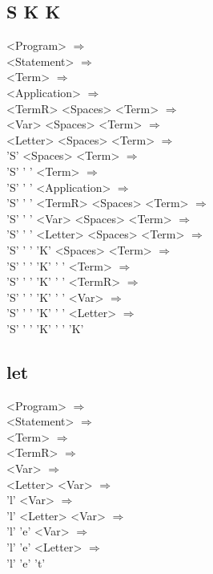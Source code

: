 \documentclass{article}
\begin{document}
\subsection{S K K}
<Program> $\Rightarrow$ \\
<Statement> $\Rightarrow$ \\
<Term> $\Rightarrow$ \\
<Application> $\Rightarrow$ \\
<TermR> <Spaces> <Term> $\Rightarrow$ \\
<Var> <Spaces> <Term> $\Rightarrow$ \\
<Letter> <Spaces> <Term> $\Rightarrow$ \\
'S' <Spaces> <Term> $\Rightarrow$ \\
'S' ' ' <Term> $\Rightarrow$ \\
'S' ' ' <Application> $\Rightarrow$ \\
'S' ' ' <TermR> <Spaces> <Term> $\Rightarrow$ \\
'S' ' ' <Var> <Spaces> <Term> $\Rightarrow$ \\
'S' ' ' <Letter> <Spaces> <Term> $\Rightarrow$ \\
'S' ' ' 'K' <Spaces> <Term> $\Rightarrow$ \\
'S' ' ' 'K' ' ' <Term> $\Rightarrow$ \\
'S' ' ' 'K' ' ' <TermR> $\Rightarrow$ \\
'S' ' ' 'K' ' ' <Var> $\Rightarrow$ \\
'S' ' ' 'K' ' ' <Letter> $\Rightarrow$ \\
'S' ' ' 'K' ' ' 'K' \\
\subsection{let}
<Program> $\Rightarrow$ \\
<Statement> $\Rightarrow$ \\
<Term> $\Rightarrow$ \\
<TermR> $\Rightarrow$ \\
<Var> $\Rightarrow$ \\
<Letter> <Var> $\Rightarrow$ \\
'l' <Var> $\Rightarrow$ \\
'l' <Letter> <Var> $\Rightarrow$ \\
'l' 'e' <Var> $\Rightarrow$ \\
'l' 'e' <Letter> $\Rightarrow$ \\
'l' 'e' 't' \\
\end{document}
